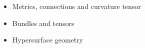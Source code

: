 \begin{itemize}
\item Metrics, connections and curvature tensor
\item Bundles and tensors
\item Hypersurface geometry
\end{itemize}